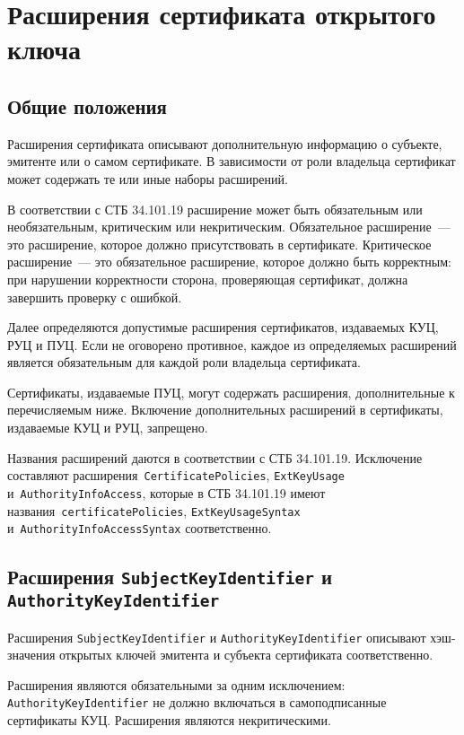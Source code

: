 \section{Расширения сертификата открытого ключа}\label{FMT.Ext}

\subsection{Общие положения}\label{FMT.Ext.Intro} 

Расширения сертификата описывают дополнительную информацию о субъекте,
эмитенте или о самом сертификате. В зависимости от роли владельца 
сертификат может содержать те или иные наборы расширений.

В соответствии с СТБ 34.101.19 расширение может быть обязательным или 
необязательным, критическим или некритическим. 
Обязательное расширение~--- это расширение, которое должно присутствовать 
в сертификате.  Критическое расширение~--- это обязательное  
расширение, которое должно быть корректным: при нарушении корректности
сторона, проверяющая сертификат, должна завершить проверку с ошибкой.

Далее определяются допустимые расширения сертификатов, издаваемых КУЦ, РУЦ и ПУЦ. 
Если не оговорено противное, каждое из определяемых расширений является 
обязательным для каждой роли владельца сертификата. 

Сертификаты, издаваемые ПУЦ, могут содержать расширения, 
дополнительные к перечисляемым ниже. Включение дополнительных расширений в 
сертификаты, издаваемые КУЦ и РУЦ, запрещено.

Названия расширений даются в соответствии с СТБ 34.101.19.
Исключение составляют расширения~\texttt{CertificatePolicies},
\texttt{ExtKeyUsage} и~\texttt{AuthorityInfoAccess},
которые в СТБ 34.101.19 имеют названия~\texttt{certificatePolicies}, 
\texttt{ExtKeyUsageSyntax} и~\texttt{AuthorityInfoAccessSyntax}
соответственно.

\subsection{Расширения \texttt{SubjectKeyIdentifier} и 
\texttt{AuthorityKeyIdentifier}}\label{FMT.Ext.SKID} 

Расширения \texttt{SubjectKeyIdentifier} и \texttt{AuthorityKeyIdentifier} 
описывают хэш-значения открытых ключей эмитента и субъекта сертификата 
соответственно. 

Расширения являются обязательными за одним исключением:
\texttt{AuthorityKeyIdentifier} не должно включаться в самоподписанные 
сертификаты КУЦ. Расширения являются некритическими. 
 

